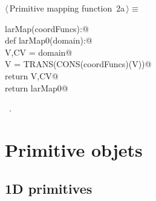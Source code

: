 \documentclass[11pt,oneside]{article}	%
\begin{document}
\begin{flushleft} \small \label{scrap2}
\protect{}$\langle\,$Primitive mapping function\nobreak\ {\footnotesize 2a}$\,\rangle\equiv$
\vspace{-1ex}
\begin{list}{}{} \item
\mbox{}\verb@def larMap(coordFuncs):@\\
\mbox{}\verb@   def larMap0(domain):@\\
\mbox{}\verb@      V,CV = domain@\\
\mbox{}\verb@      V = TRANS(CONS(coordFuncs)(V))@\\
\mbox{}\verb@      return V,CV@\\
\mbox{}\verb@   return larMap0@\\
\mbox{}\verb@@{\NWsep}
\end{list}
\vspace{-1ex}
\footnotesize\addtolength{\baselineskip}{-1ex}
\begin{list}{}{\setlength{\itemsep}{-\parsep}\setlength{\itemindent}{-\leftmargin}}
\item \NWtxtMacroRefIn\ .
\end{list}
\end{flushleft}

\section{Primitive objets}
\subsection{1D primitives}
\end{document}
